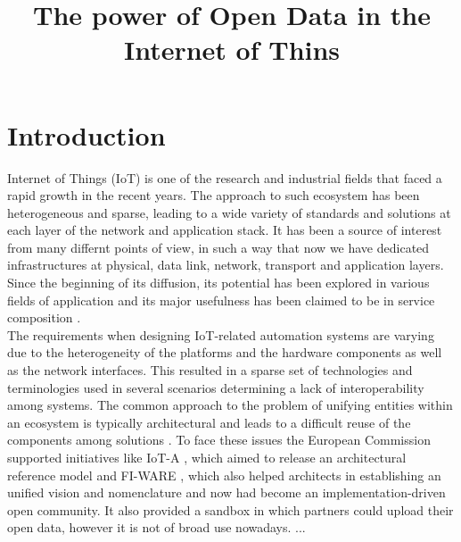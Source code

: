 \documentclass[conference]{IEEEtran}
\title{The power of Open Data in the Internet of Thins}
\author{\IEEEauthorblockN{Federico Montori, Luca Bedogni
\IEEEauthorblockA{
Department of Computer Science and Engineering (DISI)\\
University of Bologna, Italy\\
Email: \{federico.montori2, luca.bedogni4\}@unibo.it}}
}
\begin{document}
\maketitle

\begin{abstract}

\end{abstract}

\section{Introduction}
Internet of Things (IoT) is one of the research and industrial fields that faced a rapid growth in the recent years.
The approach to such ecosystem has been heterogeneous and sparse, leading to a wide variety of standards and solutions at each layer of the network and application stack.
It has been a source of interest from many differnt points of view, in such a way that now we have dedicated infrastructures at physical, data link, network, transport and application layers.
\\

Since the beginning of its diffusion, its potential has been explored in various fields of application and its major usefulness has been claimed to be in service composition \cite{atzori2010internet}.
\\

The requirements when designing IoT-related automation systems are varying due to the heterogeneity of the platforms and the hardware components as well as the network interfaces.
This resulted in a sparse set of technologies and terminologies used in several scenarios determining a lack of interoperability among systems.
The common approach to the problem of unifying entities within an ecosystem is typically architectural and leads to a difficult reuse of the components among solutions \cite{krco2014designing}.
To face these issues the European Commission supported initiatives like IoT-A \cite{iot-a}, which aimed to release an architectural reference model and FI-WARE \cite{fiware}, which also helped architects in establishing an unified vision and nomenclature and now had become an implementation-driven open community.
It also provided a sandbox in which partners could upload their open data, however it is not of broad use nowadays.
...
\end{document}
